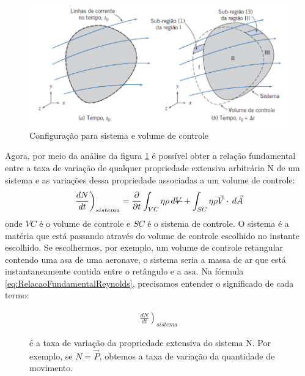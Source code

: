 \documentclass{article}
\newcommand{\stkout}[1]{\ifmmode\text{\sout{\ensuremath{#1}}}\else\sout{#1}\fi}
\begin{document}
\begin{figure}[!h]
  \centering
  \includegraphics[width=0.8\linewidth]{regioesFluido.png}
  \caption{Configuração para sistema e volume de controle}
  \label{fig:sistemaEVolControle}
\end{figure}
Agora, por meio da análise da figura \ref{fig:sistemaEVolControle} é possível obter a relação fundamental entre a taxa de variação de qualquer propriedade extensiva arbitrária N de um sistema e as variações dessa propriedade associadas a um volume de controle:
\begin{equation}
  \left.\frac{dN}{dt}\right)_{sistema}=\frac{\partial}{\partial t}\int_{VC}^{ } \eta \rho \, d\stkout{V} + \int_{SC}^{ } \eta \rho \vec{V} \cdot \, d\vec{A}
  \label{eq:RelacaoFundamentalReynolds}
\end{equation}
onde $VC$ é o volume de controle e $SC$ é o sistema de controle. O sistema é a matéria que está passando através do volume de controle escolhido no instante escolhido. Se escolhermos, por exemplo, um volume de controle retangular contendo uma asa de uma aeronave, o sistema seria a massa de ar que está instantaneamente contida entre o retângulo e a asa. Na fórmula \ref{eq:RelacaoFundamentalReynolds}, precisamos entender o significado de cada termo:

\begin{figure}[!h]
  \centering
  \begin{minipage}{0.45\textwidth}
    \begin{align*}
      \left.\frac{dN}{dt}\right)_{sistema}
    \end{align*}
  \end{minipage}\hfill
  \begin{minipage}{0.45\textwidth}
    é a taxa de variação da propriedade extensiva do sistema N. Por exemplo, se $N=\vec{P}$, obtemos a taxa de variação da quantidade de movimento.
  \end{minipage}
\end{figure}
\end{document}
